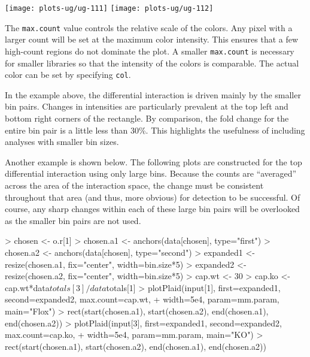 \documentclass[12pt]{report}
\renewenvironment{Schunk}{\vspace{0pt}}{\vspace{0pt}}
\newcommand{\code}[1]{{\small\texttt{#1}}}
\begin{document}
\begin{center}
\texttt{[image: plots-ug/ug-111]}
\texttt{[image: plots-ug/ug-112]}
\end{center}

The \code{max.count} value controls the relative scale of the colors. 
Any pixel with a larger count will be set at the maximum color intensity.
This ensures that a few high-count regions do not dominate the plot.
A smaller \code{max.count} is necessary for smaller libraries so that the intensity of the colors is comparable.
The actual color can be set by specifying \code{col}.

In the example above, the differential interaction is driven mainly by the smaller bin pairs.
Changes in intensities are particularly prevalent at the top left and bottom right corners of the rectangle.
By comparison, the fold change for the entire bin pair is a little less than 30\%.
This highlights the usefulness of including analyses with smaller bin sizes.

Another example is shown below.
The following plots are constructed for the top differential interaction using only large bins.
Because the counts are ``averaged'' across the area of the interaction space, the change must be consistent throughout that area (and thus, more obvious) for detection to be successful.
Of course, any sharp changes within each of these large bin pairs will be overlooked as the smaller bin pairs are not used.




\begin{Schunk}
\begin{Sinput}
> chosen <- o.r[1]
> chosen.a1 <- anchors(data[chosen], type="first")
> chosen.a2 <- anchors(data[chosen], type="second")
> expanded1 <- resize(chosen.a1, fix="center", width=bin.size*5)
> expanded2 <- resize(chosen.a2, fix="center", width=bin.size*5)
> cap.wt <- 30
> cap.ko <- cap.wt*data$totals[3]/data$totals[1]
> plotPlaid(input[1], first=expanded1, second=expanded2, max.count=cap.wt, 
+     width=5e4, param=mm.param, main="Flox")
> rect(start(chosen.a1), start(chosen.a2), end(chosen.a1), end(chosen.a2))
> plotPlaid(input[3], first=expanded1, second=expanded2, max.count=cap.ko, 
+     width=5e4, param=mm.param, main="KO")
> rect(start(chosen.a1), start(chosen.a2), end(chosen.a1), end(chosen.a2))
\end{Sinput}
\end{Schunk}
\end{document}
